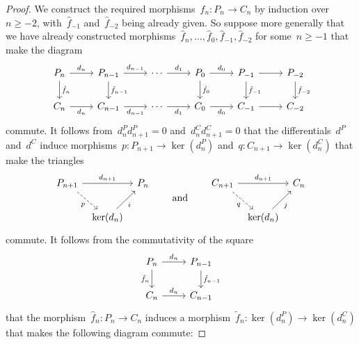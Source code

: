 \begin{proof}
  We construct the required morphisms~$\hat{f}_n \colon P_n \to C_n$ by induction over~$n \geq -2$, with~$\hat{f}_{-1}$ and~$\hat{f}_{-2}$ being already given.
  So suppose more generally that we have already constructed morphisms~$\hat{f}_n, \dotsc, \hat{f}_0, \hat{f}_{-1}, \hat{f}_{-2}$ for some~$n \geq -1$ that make the diagram
  \[
    \begin{tikzcd}
        P_n
        \arrow{r}[above]{d_n}
        \arrow{d}[right]{\hat{f}_n}
      & P_{n-1}
        \arrow{r}[above]{d_{n-1}}
        \arrow{d}[right]{\hat{f}_{n-1}}
      & \dotsb
        \arrow{r}[above]{d_1}
      & P_0
        \arrow{r}[above]{d_0}
        \arrow{d}[right]{\hat{f}_0}
      & P_{-1}
        \arrow{r}
        \arrow{d}[right]{\hat{f}_{-1}}
      & P_{-2}
        \arrow{d}[right]{\hat{f}_{-2}}
      \\
        C_n
        \arrow{r}[below]{d_n}
      & C_{n-1}
        \arrow{r}[below]{d_{n-1}}
      & \dotsb
        \arrow{r}[below]{d_1}
      & C_0
        \arrow{r}[below]{d_0}
      & C_{-1}
        \arrow{r}
      & C_{-2}
    \end{tikzcd}
  \]
  commute.
  It follows from~$d^P_n d^P_{n+1} = 0$ and~$d^C_n d^C_{n+1} = 0$ that the differentials~$d^P$ and~$d^C$ induce morphisms~$p \colon P_{n+1} \to \ker(d^P_n)$ and~$q \colon C_{n+1} \to \ker(d^C_n)$ that make the triangles
  \[
    \begin{tikzcd}[column sep = tiny]
        P_{n+1}
        \arrow{rr}[above]{d_{n+1}}
        \arrow[dashed]{dr}[below left]{p}
      & {}
      & P_n
      \\
        {}
      & \ker(d_n)
        \arrow{ur}[below right]{i}
      & {}
    \end{tikzcd}
    \qquad\text{and}\qquad
    \begin{tikzcd}[column sep = tiny]
        C_{n+1}
        \arrow{rr}[above]{d_{n+1}}
        \arrow[dashed]{dr}[below left]{q}
      & {}
      & C_n
      \\
        {}
      & \ker(d_n)
        \arrow{ur}[below right]{j}
      & {}
    \end{tikzcd}
  \]
  commute.
  It follows from the commutativity of the square
  \[
    \begin{tikzcd}
        P_n
        \arrow{r}[above]{d_n}
        \arrow{d}[left]{\hat{f}_n}
      & P_{n-1}
        \arrow{d}[right]{\hat{f}_{n-1}}
      \\
        C_n
        \arrow{r}[above]{d_n}
      & C_{n-1}
    \end{tikzcd}
  \]
  that the morphism~$\hat{f}_n \colon P_n \to C_n$ induces a morphism~$\tilde{f}_n \colon \ker(d^P_n) \to \ker(d^C_n)$ that makes the following diagram commute:

\end{proof}
